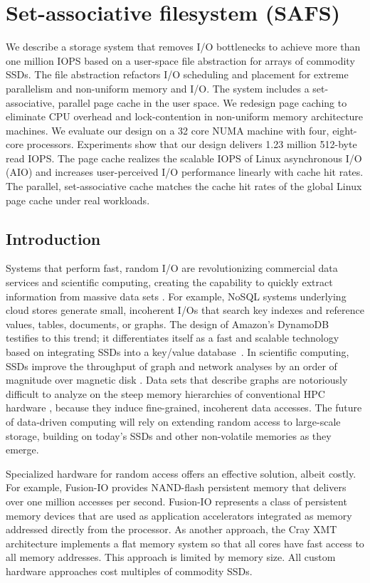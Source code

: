 \chapter{Set-associative filesystem (SAFS)}
\label{sec:safs}
\chaptermark{}

We describe a storage system that 
removes I/O bottlenecks to achieve more than one million IOPS
based on a user-space file abstraction for arrays of commodity SSDs.
The file abstraction refactors I/O scheduling and placement for extreme
parallelism and non-uniform memory and I/O.
The system includes a set-associative, parallel page cache in the user space.
We redesign page caching to eliminate CPU overhead and lock-contention in non-uniform memory
architecture machines.
We evaluate our design on a 32 core NUMA machine with four, eight-core processors. 
Experiments show that our design delivers 1.23 million 512-byte read IOPS.
The page cache realizes the scalable IOPS of Linux asynchronous I/O (AIO) 
and increases
user-perceived I/O performance linearly with cache hit rates.
The parallel, set-associative cache matches the cache hit rates
of the global Linux page cache under real workloads.

\section{Introduction}

Systems that perform fast, random I/O are revolutionizing commercial data
services and scientific computing, creating the capability to quickly 
extract information from massive data sets \cite{4thparadigm}.  
For example, NoSQL systems underlying cloud stores generate
small, incoherent I/Os that search key indexes and reference values, tables, documents,
or graphs.  The design of Amazon's DynamoDB testifies to this trend; it differentiates
itself as a fast and scalable technology based on integrating SSDs
into a key/value database~\cite{dynamodb}.  In scientific computing, SSDs improve the throughput 
of graph and network analyses by an order of magnitude over magnetic disk \cite{Pearce10}.
Data sets that describe graphs are notoriously difficult
to analyze on the steep memory hierarchies of conventional HPC hardware 
\cite{Hendrickson09}, because they induce fine-grained, incoherent data accesses.
The future of data-driven computing will rely on extending random access to large-scale 
storage, building on today's SSDs and other non-volatile memories as they emerge.

Specialized hardware for random access offers an effective solution,
albeit costly.  For example, Fusion-IO provides 
NAND-flash persistent memory that delivers over one million accesses per second.
Fusion-IO represents a class of persistent memory devices that are used as 
application accelerators integrated as memory addressed directly from the processor.  
As another approach, the Cray XMT architecture implements a flat memory system so 
that all cores have fast access to all memory addresses.  This approach
is limited by memory size.  All custom hardware approaches cost multiples of commodity SSDs.

